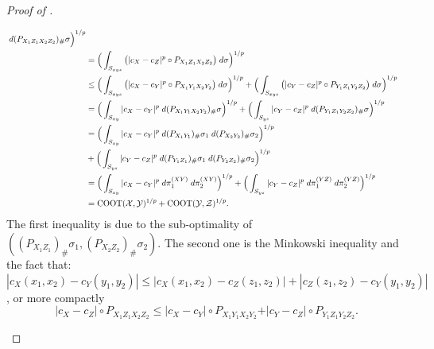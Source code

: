 \begin{proof}[Proof of ]
\begin{enumerate}
\begin{equation}
\begin{split}
        \; d(P_{X_1 Z_1 X_2 Z_2})_{\#} \sigma \Big)^{1/p} \\
        &= \Big( \int_{S_{xyz}} \big( \vert c_X - c_Z \vert^p \circ P_{X_1 Z_1 X_2 Z_2} \big)
        \; d \sigma \Big)^{1/p} \\
        &\leq \Big( \int_{S_{xyz}} \big( \vert c_X - c_Y \vert^p \circ P_{X_1 Y_1 X_2 Y_2} \big)
        \; d \sigma \Big)^{1/p} +
        \Big( \int_{S_{xyz}} \big( \vert c_Y - c_Z \vert^p \circ P_{Y_1 Z_1 Y_2 Z_2} \big)
        \; d \sigma \Big)^{1/p} \\
        &= \Big( \int_{S_{xy}} \vert c_X - c_Y \vert^p
        \; d (P_{X_1 Y_1 X_2 Y_2})_{\#} \sigma \Big)^{1/p}  +
        \Big( \int_{S_{yz}} \vert c_Y - c_Z \vert^p
        \; d (P_{Y_1 Z_1 Y_2 Z_2})_{\#} \sigma \Big)^{1/p}  \\
        &= \Big( \int_{S_{xy}} \vert c_X - c_Y \vert^p
        \; d (P_{X_1 Y_1})_{\#} \sigma_1 \; d (P_{X_2 Y_2})_{\#} \sigma_2 \Big)^{1/p} \\
        &+ \Big( \int_{S_{yz}} \vert c_Y - c_Z \vert^p
        \; d (P_{Y_1 Z_1})_{\#} \sigma_1 \; d (P_{Y_2 Z_2})_{\#} \sigma_2 \Big)^{1/p} \\
        &= \Big( \int_{S_{xy}} \vert c_X - c_Y \vert^p \; d \pi^{(XY)}_1 \; d \pi^{(XY)}_2 \Big)^{1/p}  +
        \Big( \int_{S_{yz}} \vert c_Y - c_Z \vert^p \; d \pi^{(YZ)}_1 \; d \pi^{(YZ)}_2 \Big)^{1/p} \\
        &= \text{COOT}(\mathcal X, \mathcal Y)^{1/p} + \text{COOT}(\mathcal Y, \mathcal Z)^{1/p}.
      \end{split}
    \end{equation}
    The first inequality is due to the sub-optimality of
    $((P_{X_1 Z_1})_{\#} \sigma_1, (P_{X_2 Z_2})_{\#} \sigma_2)$. The second one is
    the Minkowski inequality and the fact that:
    $|c_X(x_1,x_2) - c_Y(y_1,y_2)| \leq |c_X(x_1,x_2) - c_Z(z_1,z_2)| + |c_Z(z_1,z_2) - c_Y(y_1,y_2)|$,
    or more compactly
    \begin{equation}
      \vert c_X - c_Z \vert \circ P_{X_1 Z_1 X_2 Z_2} \leq
      \vert c_X - c_Y \vert \circ P_{X_1 Y_1 X_2 Y_2} +
      \vert c_Y - c_Z \vert \circ P_{Y_1 Z_1 Y_2 Z_2}.
    \end{equation}
  \end{enumerate}
\end{proof}


